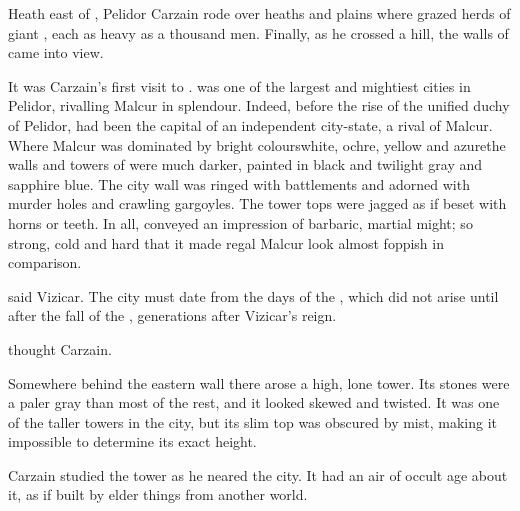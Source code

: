 
\bookchapter{\Forklin}

\begin{comment}
  \subsection{Carzain rides to \Forclin}
\end{comment}
\stamp{\dateCarzainReturnsToForklin}
  {Heath east of , Pelidor}
Carzain \Shachar rode over heaths and plains where grazed herds of giant \saurians, each as heavy as a thousand men. 
Finally, as he crossed a hill, the walls of \Forclin came into view. 

It was Carzain's first visit to \Forclin. 
\Forklin was one of the largest and mightiest cities in Pelidor, rivalling Malcur in splendour. 
Indeed, before the rise of the unified duchy of Pelidor, \Forklin{} had been the capital of an independent city-state, a rival of Malcur. 
Where Malcur was dominated by bright colours\dash white, ochre, yellow and azure\dash the walls and towers of \Forklin were much darker, painted in black and twilight gray and sapphire blue. 
The city wall was ringed with battlements and adorned with murder holes and crawling gargoyles. 
The tower tops were jagged as if beset with horns or teeth. 
In all, \Forklin conveyed an impression of barbaric, martial might; so strong, cold and hard that it made regal Malcur look almost foppish in comparison. 

 said Vizicar.
The city must date from the days of the \Ortaican \bacconate, which did not arise until after the fall of the \VaimonCaliphate, generations after Vizicar's reign. 


 thought Carzain. 

Somewhere behind the eastern wall there arose a high, lone tower. 
Its stones were a paler gray than most of the rest, and it looked skewed and twisted. 
It was one of the taller towers in the city, but its slim top was obscured by mist, making it impossible to determine its exact height. 

Carzain studied the tower as he neared the city. 
It had an air of occult age about it, as if built by elder things from another world. 

